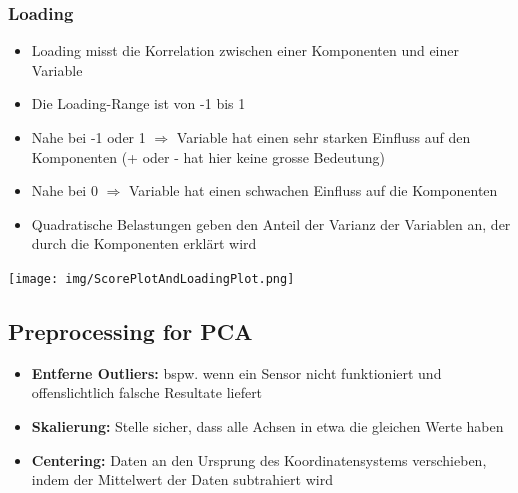 \documentclass{article}
\newenvironment{Figure}
	{\par\medskip\noindent\minipage{\linewidth}}
	{\endminipage\par\medskip}
\theoremstyle{merke}
\theoremstyle{definition}
\begin{document}
		\subsubsection{Loading}
        \begin{itemize}
            \item Loading misst die Korrelation zwischen einer Komponenten und einer Variable
            \item Die Loading-Range ist von -1 bis 1
            \item Nahe bei -1 oder 1 $\Rightarrow$ Variable hat einen sehr starken Einfluss auf den Komponenten (+ oder - hat hier keine grosse Bedeutung)
            \item Nahe bei 0 $\Rightarrow$ Variable hat einen schwachen Einfluss auf die Komponenten
            \item Quadratische Belastungen geben den Anteil der Varianz der Variablen an, der durch die Komponenten erklärt wird
        \end{itemize}
        \begin{Figure}
        \centering
        \texttt{[image: img/ScorePlotAndLoadingPlot.png]}
            \label{fig:Kombination eines Scores Plot mit einem Loading Plot}
        \end{Figure}

	\subsection{Preprocessing for PCA}
    \begin{itemize}
        \item \textbf{Entferne Outliers:} bspw. wenn ein  Sensor nicht funktioniert und offenslichtlich falsche Resultate liefert
        \item \textbf{Skalierung:} Stelle sicher, dass alle Achsen in etwa die gleichen Werte haben
        \item \textbf{Centering:} Daten an den Ursprung des Koordinatensystems verschieben, indem der Mittelwert der Daten subtrahiert wird 
    \end{itemize}
\end{document}
